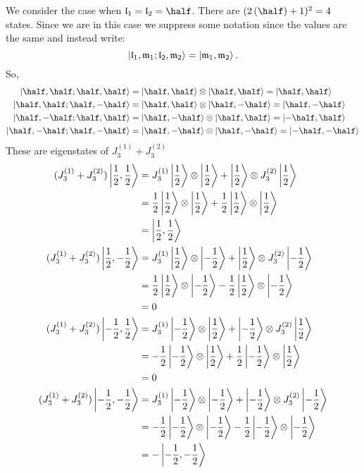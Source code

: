 \documentclass[12pt, a4paper]{article}
\begin{document}
\begin{example}
    We consider the case when \(\mathfrak{l}_1=\mathfrak{l}_2=\half\). There are \((2\left( \half \right) +1)^2=4\) states. Since we are in this case we suppress some notation since the values are the same and instead write:
    \[\ket{\mathfrak{l}_1,\mathfrak{m}_1 ; \mathfrak{l}_2,\mathfrak{m}_2} = \ket{\mathfrak{m}_1,\mathfrak{m}_2}.\]
    So,
    \[\begin{aligned}
        \ket{\half,\half;\half,\half} &= \ket{\half,\half}\otimes\ket{\half,\half} =\ket{\half,\half} \\
        \ket{\half,\half;\half,-\half} &= \ket{\half,\half}\otimes\ket{\half,-\half} =\ket{\half,-\half} \\
        \ket{\half,-\half;\half,\half} &= \ket{\half,-\half}\otimes\ket{\half,\half} =\ket{-\half,\half} \\
        \ket{\half,-\half;\half,-\half} &= \ket{\half,-\half}\otimes\ket{\half,-\half} =\ket{-\half,-\half} 
    \end{aligned}\]
    These are eigenstates of \( J^{(1)}_3 + J^{(2)}_3 \)
    \[\begin{aligned}
(J^{(1)}_3 + J^{(2)}_3) \ket{\frac{1}{2}, \frac{1}{2}} &= J^{(1)}_3 \ket{\frac{1}{2}} \otimes \ket{\frac{1}{2}} + \ket{\frac{1}{2}} \otimes J^{(2)}_3 \ket{\frac{1}{2}} \\
&= \frac{1}{2} \ket{\frac{1}{2}} \otimes \ket{\frac{1}{2}} + \frac{1}{2} \ket{\frac{1}{2}} \otimes \ket{\frac{1}{2}} \\
&= \ket{\frac{1}{2}, \frac{1}{2}} \\
(J^{(1)}_3 + J^{(2)}_3) \ket{\frac{1}{2}, -\frac{1}{2}} &= J^{(1)}_3 \ket{\frac{1}{2}} \otimes \ket{-\frac{1}{2}} + \ket{\frac{1}{2}} \otimes J^{(2)}_3 \ket{-\frac{1}{2}} \\
&= \frac{1}{2} \ket{\frac{1}{2}} \otimes \ket{-\frac{1}{2}} - \frac{1}{2} \ket{\frac{1}{2}} \otimes \ket{-\frac{1}{2}} \\
&= 0 \\
(J^{(1)}_3 + J^{(2)}_3) \ket{-\frac{1}{2}, \frac{1}{2}} &= J^{(1)}_3 \ket{-\frac{1}{2}} \otimes \ket{\frac{1}{2}} + \ket{-\frac{1}{2}} \otimes J^{(2)}_3 \ket{\frac{1}{2}} \\
&= -\frac{1}{2} \ket{-\frac{1}{2}} \otimes \ket{\frac{1}{2}} + \frac{1}{2} \ket{-\frac{1}{2}} \otimes \ket{\frac{1}{2}} \\
&= 0 \\
(J^{(1)}_3 + J^{(2)}_3) \ket{-\frac{1}{2}, -\frac{1}{2}} &= J^{(1)}_3 \ket{-\frac{1}{2}} \otimes \ket{-\frac{1}{2}} + \ket{-\frac{1}{2}} \otimes J^{(2)}_3 \ket{-\frac{1}{2}} \\
&= -\frac{1}{2} \ket{-\frac{1}{2}} \otimes \ket{-\frac{1}{2}} - \frac{1}{2} \ket{-\frac{1}{2}} \otimes \ket{-\frac{1}{2}} \\
&= -\ket{-\frac{1}{2}, -\frac{1}{2}}
\end{aligned}\]


\end{example}
\end{document}
